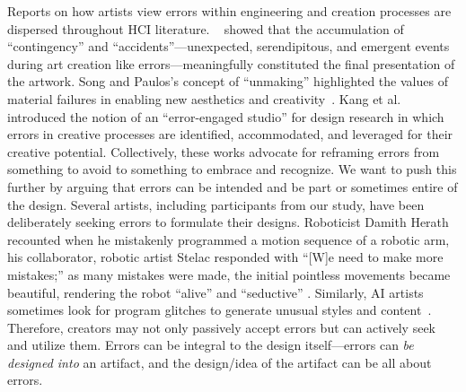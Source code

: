 Reports on how artists view errors within engineering and creation processes are dispersed throughout HCI literature. ~\citet{nam2023dreams} showed that the accumulation of ``contingency'' and ``accidents''---unexpected, serendipitous, and emergent events during art creation like errors---meaningfully constituted the final presentation of the artwork. Song and Paulos's concept of ``unmaking'' highlighted the values of material failures in enabling new aesthetics and creativity~\cite{song2021unmaking}. Kang et al.~\cite{kang2022electronicists, kang2023lady} introduced the notion of an ``error-engaged studio'' for design research in which errors in creative processes are identified, accommodated, and leveraged for their creative potential. Collectively, these works advocate for reframing errors from something to avoid to something to embrace and recognize. We want to push this further by arguing that errors can be intended and be part or sometimes entire of the design. Several artists, including participants from our study, have been deliberately seeking errors to formulate their designs. Roboticist Damith Herath recounted when he mistakenly programmed a motion sequence of a robotic arm, his collaborator, robotic artist Stelac responded with ``[W]e need to make more mistakes;'' as many mistakes were made, the initial pointless movements became beautiful, rendering the robot ``alive'' and ``seductive'' \cite{herath2016robots}. Similarly, AI artists sometimes look for program glitches to generate unusual styles and content~\cite{chang2023prompt}. Therefore, creators may not only passively accept errors but can actively seek and utilize them. Errors can be integral to the design itself---errors can \textit{be designed into} an artifact, and the design/idea of the artifact can be all about errors.

